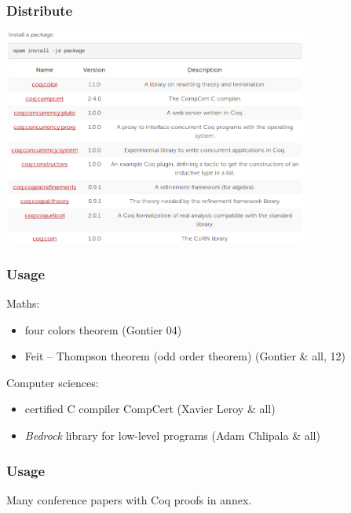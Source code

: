 \begin{frame}
  \frametitle{Distribute}
  \begin{center}
    \includegraphics[width=10cm]{images/opam}
  \end{center}
\end{frame}

\begin{frame}
  \frametitle{Usage}
  Maths:
  \begin{itemize}
    \item four colors theorem (Gontier 04)
    \item Feit -- Thompson theorem (odd order theorem) (Gontier \& all, 12)
  \end{itemize}

  Computer sciences:
  \begin{itemize}
    \item certified \textsc{C} compiler CompCert (Xavier Leroy \& all)
    \item \emph{Bedrock} library for low-level programs (Adam Chlipala \& all)
  \end{itemize}
\end{frame}

\begin{frame}
  \frametitle{Usage}
  Many conference papers with Coq proofs in annex.
\end{frame}



